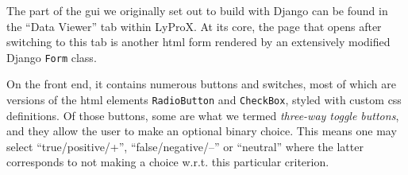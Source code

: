 \documentclass[\relativeRoot/main.tex]{subfiles}
\begin{document}
The part of the \gls{gui} we originally set out to build with Django can be found in the ``Data Viewer'' tab within LyProX. At its core, the page that opens after switching to this tab is another \acrshort{html} form rendered by an extensively modified Django \texttt{Form} class.

On the front end, it contains numerous buttons and switches, most of which are versions of the \acrshort{html} elements \texttt{RadioButton} and \texttt{CheckBox}, styled with custom \acrshort{css} definitions. Of those buttons, some are what we termed \emph{three-way toggle buttons}, and they allow the user to make an optional binary choice. This means one may select ``true/positive/+'', ``false/negative/--'' or ``neutral'' where the latter corresponds to not making a choice w.r.t. this particular criterion.
\end{document}
